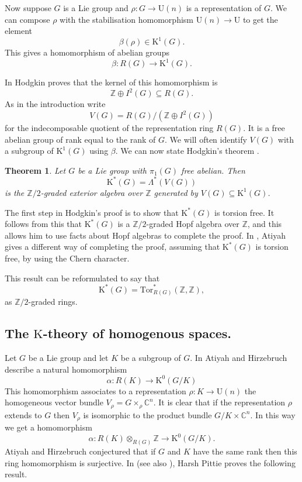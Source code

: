 \documentclass[twoside,a4paper,reqno,11pt]{amsart}
\newtheorem{theorem}[lemma]{Theorem}
\newcommand{\C}{\mathbb{C}}
\newcommand{\K}{\mathrm{K}}
\newcommand{\Z}{\mathbb{Z}}
\newcommand{\Tor}{\mathrm{Tor}}
\newcommand{\U}{\mathrm{U}}
\begin{document}
Now suppose $G$ is a Lie group and $\rho : G \to \U(n)$ is a representation of $G$. We can compose $\rho$ with the stabilisation homomorphism $\U(n) \to \U$ to get the element
$$
\beta(\rho)  \in \K^1(G).
$$
This gives a homomorphism of abelian groups 
\[ \beta : R(G) \to \K^1(G).\]

In \cite[Lemma~4.1]{MR214099} Hodgkin proves that the kernel of this homomorphism is
$$
\Z \oplus I^2(G) \subseteq R(G).
$$
As in the introduction write
$$
V(G) = R(G)/(\Z \oplus I^2(G))
$$
for the indecomposable quotient of the representation ring $R(G)$. It is a free abelian group of rank equal to the rank of $G$.  We will often identify $V(G)$ with a subgroup of $\K^1(G)$ using $\beta$. We can now state Hodgkin's theorem
\cite[Theorem~A]{MR214099}.

\begin{theorem} \label{thm:Hodgkinsthm} Let $G$ be a Lie group with $\pi_1(G)$ free abelian. Then
$$
\K^*(G) = \Lambda^*(V(G))
$$
is the $\Z/2$-graded exterior algebra over $\Z$ generated by $V(G) \subseteq \K^1(G)$.
\end{theorem}

The first step in Hodgkin's proof is to show that $\K^*(G)$ is torsion free. It follows from this that $\K^*(G)$ is a $\Z/2$-graded Hopf algebra over $\Z$, and this allows him to use facts about Hopf algebras to complete the proof.  In \cite{MR178092}, Atiyah gives a different way of completing the proof, assuming that $\K^*(G)$ is torsion free, by using the Chern character.

This result can be reformulated to say that 
$$
\K^*(G) = \Tor^*_{R(G)}(\Z, \Z),
$$
as $\Z/2$-graded rings.

\subsection{The $\K$-theory of homogenous spaces.} 
Let $G$ be a Lie group and let $K$ be a subgroup of $G$.  In \cite{AH} Atiyah and Hirzebruch describe a natural homomorphism
 $$
 \alpha : R(K) \to \K^0(G/K)
 $$
This homomorphism associates to a representation $\rho : K \to \U(n)$ the homogeneous vector bundle $V_{\rho}= G \times_{\rho} \C^n$.  It is clear that if the representation $\rho$ extends to $G$ then $V_{\rho}$ is isomorphic to the product bundle $G/K \times \C^n$.  In this way we get a homomorphism
$$
\alpha : R(K) \otimes_{R(G)} \Z \to \K^0(G/K).
$$
Atiyah and Hirzebruch conjectured that if $G$ and $K$ have the same rank then this ring homomorphism is surjective.
In \cite{MR0290402} (see also \cite{MR0372897}), Harsh Pittie  proves the following result.
\end{document}
